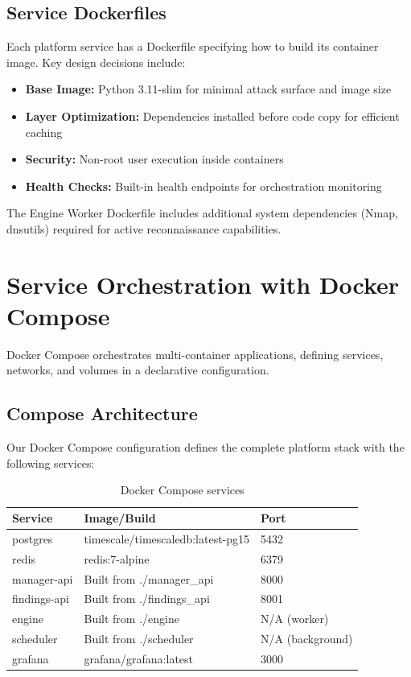 \documentclass[a4paper,12pt]{report}
\begin{document}
\subsection{Service Dockerfiles}

Each platform service has a Dockerfile specifying how to build its container image. Key design decisions include:

\begin{itemize}
\item \textbf{Base Image:} Python 3.11-slim for minimal attack surface and image size
\item \textbf{Layer Optimization:} Dependencies installed before code copy for efficient caching
\item \textbf{Security:} Non-root user execution inside containers
\item \textbf{Health Checks:} Built-in health endpoints for orchestration monitoring
\end{itemize}

The Engine Worker Dockerfile includes additional system dependencies (Nmap,\cite{nmap_docs} dnsutils) required for active reconnaissance capabilities.\hfill \break

\section{Service Orchestration with Docker Compose}

Docker Compose orchestrates multi-container applications, defining services, networks, and volumes in a declarative configuration.

\subsection{Compose Architecture}

Our Docker Compose\cite{docker_compose_docs} configuration defines the complete platform stack with the following services:\hfill \break

\begin{table}[H]
\centering
\caption{Docker Compose services}
\begin{tabular}{|l|l|l|}
\hline
\textbf{Service} & \textbf{Image/Build} & \textbf{Port} \\
\hline
postgres & timescale/timescaledb:latest-pg15 & 5432 \\
\hline
redis & redis:7-alpine & 6379 \\
\hline
manager-api & Built from ./manager\_api & 8000 \\
\hline
findings-api & Built from ./findings\_api & 8001 \\
\hline
engine & Built from ./engine & N/A (worker) \\
\hline
scheduler & Built from ./scheduler & N/A (background) \\
\hline
grafana & grafana/grafana:latest & 3000 \\
\hline
\end{tabular}
\label{tab:compose_services}
\end{table}
\end{document}
